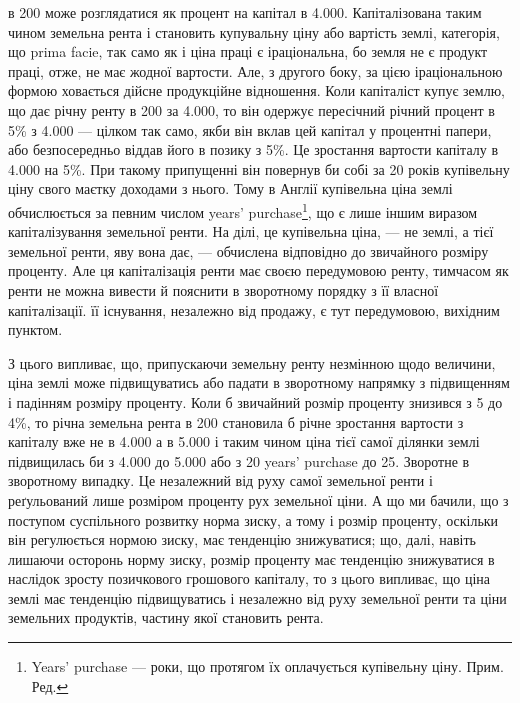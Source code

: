 \parcont{}  %
в 200 може розглядатися як процент на капітал в \num{4.000}. Капіталізована
таким чином земельна рента і становить купувальну ціну або вартість землі,
категорія, що prima facie, так само як і ціна праці є іраціональна, бо земля не є продукт
праці, отже, не має жодної вартости. Але, з другого боку, за цією іраціональною
формою ховається дійсне продукційне відношення. Коли капіталіст купує
землю, що дає річну ренту в 200 за \num{4.000}, то він одержує пересічний річний
процент в 5\% з \num{4.000} — цілком так само, якби він вклав цей капітал у
процентні папери, або безпосередньо віддав його в позику з 5\%. Це зростання вартости
капіталу в \num{4.000} на 5\%. При такому припущенні він повернув би собі
за 20 років купівельну ціну свого маєтку доходами з нього. Тому в Англії купівельна
ціна землі обчислюється за певним числом years’ purchase\footnote*{
Years’ purchase — роки, що протягом їх оплачується купівельну ціну. Прим. Ред.
}, що є лише іншим
виразом капіталізування земельної ренти. На ділі, це купівельна ціна, — не
землі, а тієї земельної ренти, яву вона дає, — обчислена відповідно до звичайного
розміру проценту. Але ця капіталізація ренти має своєю передумовою
ренту, тимчасом як ренти не можна вивести й пояснити в зворотному порядку
з її власної капіталізації. її існування, незалежно від продажу, є тут
передумовою, вихідним пунктом.

З цього випливає, що, припускаючи земельну ренту незмінною щодо величини,
ціна землі може підвищуватись або падати в зворотному напрямку з
підвищенням і падінням розміру проценту. Коли б звичайний розмір проценту
знизився з 5 до 4\%, то річна земельна рента в 200 становила б річне
зростання вартости з капіталу вже не в \num{4.000} а в \num{5.000} і таким чином
ціна тієї самої ділянки землі підвищилась би з \num{4.000} до \num{5.000} або з 20 years’
purchase до 25. Зворотне в зворотному випадку. Це незалежний від руху самої
земельної ренти і реґульований лише розміром проценту рух земельної ціни.
А що ми бачили, що з поступом суспільного розвитку норма зиску, а тому і
розмір проценту, оскільки він регулюється нормою зиску, має тенденцію
знижуватися; що, далі, навіть лишаючи осторонь норму зиску, розмір проценту
має тенденцію знижуватися в наслідок зросту позичкового грошового капіталу,
то з цього випливає, що ціна землі має тенденцію підвищуватись і незалежно
від руху земельної ренти та ціни земельних продуктів, частину якої становить
рента.

